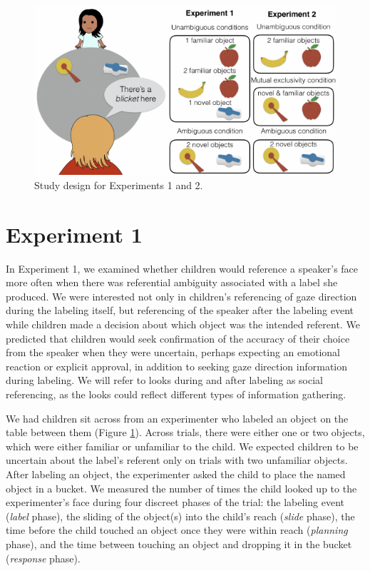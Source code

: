 \documentclass[10pt, letterpaper]{article}
\newenvironment{CodeChunk}{}{}
\begin{document}
\begin{CodeChunk}
\captionsetup{width=0.8\textwidth}\begin{figure}[h]

{\centering \includegraphics{figs/design-1} 

}

\caption[Study design for Experiments 1 and 2]{Study design for Experiments 1 and 2.}\label{fig:design}
\end{figure}
\end{CodeChunk}

\section{Experiment 1}\label{experiment-1}

In Experiment 1, we examined whether children would reference a
speaker's face more often when there was referential ambiguity
associated with a label she produced. We were interested not only in
children's referencing of gaze direction during the labeling itself, but
referencing of the speaker after the labeling event while children made
a decision about which object was the intended referent. We predicted
that children would seek confirmation of the accuracy of their choice
from the speaker when they were uncertain, perhaps expecting an
emotional reaction or explicit approval, in addition to seeking gaze
direction information during labeling. We will refer to looks during and
after labeling as social referencing, as the looks could reflect
different types of information gathering.

We had children sit across from an experimenter who labeled an object on
the table between them (Figure \ref{fig:design}). Across trials, there
were either one or two objects, which were either familiar or unfamiliar
to the child. We expected children to be uncertain about the label's
referent only on trials with two unfamiliar objects. After labeling an
object, the experimenter asked the child to place the named object in a
bucket. We measured the number of times the child looked up to the
experimenter's face during four discreet phases of the trial: the
labeling event (\emph{label} phase), the sliding of the object(s) into
the child's reach (\emph{slide} phase), the time before the child
touched an object once they were within reach (\emph{planning} phase),
and the time between touching an object and dropping it in the bucket
(\emph{response} phase).
\end{document}
